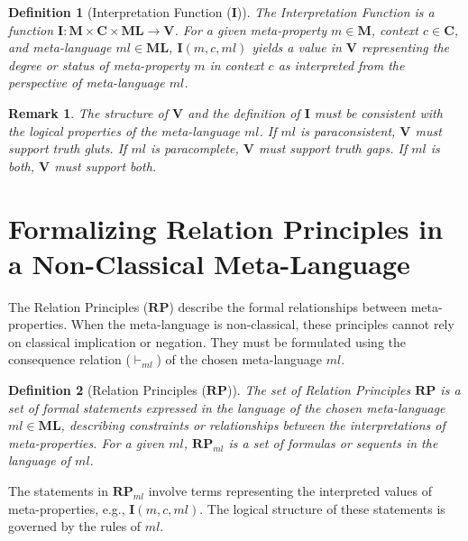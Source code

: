 \documentclass{article}
\newcommand{\entails}{\vdash}
\newcommand{\MetaProps}{\mathbf{M}}
\newcommand{\ContextParams}{\mathbf{C}}
\newcommand{\InterpFunc}{\mathbf{I}}
\newcommand{\RelPrinciples}{\mathbf{RP}}
\newcommand{\ValueSpace}{\mathbf{V}}
\newcommand{\MetaLang}{\mathbf{ML}}
\newtheorem{definition}{Definition}[section] %
\newtheorem{remark}{Remark}[section] %
\begin{document}
					\begin{definition}[Interpretation Function ($\InterpFunc$)]
						The Interpretation Function is a function $\InterpFunc: \MetaProps \times \ContextParams \times \MetaLang \rightarrow \ValueSpace$. For a given meta-property $m \in \MetaProps$, context $c \in \ContextParams$, and meta-language $ml \in \MetaLang$, $\InterpFunc(m, c, ml)$ yields a value in $\ValueSpace$ representing the degree or status of meta-property $m$ in context $c$ as interpreted from the perspective of meta-language $ml$.
					\end{definition}
					
					\begin{remark}
						\RaggedRight %
						The structure of $\ValueSpace$ and the definition of $\InterpFunc$ must be consistent with the logical properties of the meta-language $ml$. If $ml$ is paraconsistent, $\ValueSpace$ must support truth gluts. If $ml$ is paracomplete, $\ValueSpace$ must support truth gaps. If $ml$ is both, $\ValueSpace$ must support both.
						\end{remark}
							
							\section{Formalizing Relation Principles in a Non-Classical Meta-Language}
							
							The Relation Principles ($\RelPrinciples$) describe the formal relationships between meta-properties. When the meta-language is non-classical, these principles cannot rely on classical implication or negation. They must be formulated using the consequence relation ($\entails_{ml}$) of the chosen meta-language $ml$.
							
							\begin{definition}[Relation Principles ($\RelPrinciples$)]
								The set of Relation Principles $\RelPrinciples$ is a set of formal statements expressed in the language of the chosen meta-language $ml \in \MetaLang$, describing constraints or relationships between the interpretations of meta-properties. For a given $ml$, $\RelPrinciples_{ml}$ is a set of formulas or sequents in the language of $ml$.
								\end{definition}
									
									The statements in $\RelPrinciples_{ml}$ involve terms representing the interpreted values of meta-properties, e.g., $\InterpFunc(m, c, ml)$. The logical structure of these statements is governed by the rules of $ml$.
									
\end{document}
